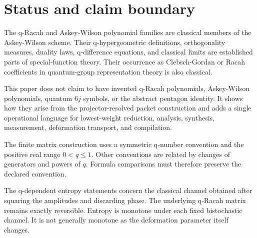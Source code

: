 \documentclass[11pt,openany]{report}
\theoremstyle{definition}
\theoremstyle{remark}
\begin{document}
\begin{abstract}
The scalar side is developed independently through the terminating q-Racah ${}_4\phi_3$ function and the continuous Askey-Wilson function. Exact duality, the $q\to1$ Racah limit, and the Askey-Wilson q-difference equation are verified symbolically or at high precision. q-Racah and Askey-Wilson functions, quantum-group recoupling, and the pentagon identity are classical. The generated contribution is the common packet architecture that retains the q-Hahn seed, projector reduction, q-Racah analysis and synthesis, stochastic measurement, deformation flow, associator certificate, and finite compiler in one system.

All figures were generated by the accompanying Python program. The release contains 32 vector figures, matching PNG files, 23 built-in checks, 20 independent tests, numerical tables, and the complete source.
\end{abstract}

\chapter*{Status and claim boundary}
The q-Racah and Askey-Wilson polynomial families are classical members of the Askey-Wilson scheme. Their q-hypergeometric definitions, orthogonality measures, duality laws, q-difference equations, and classical limits are established parts of special-function theory. Their occurrence as Clebsch-Gordan or Racah coefficients in quantum-group representation theory is also classical.

This paper does not claim to have invented q-Racah polynomials, Askey-Wilson polynomials, quantum $6j$ symbols, or the abstract pentagon identity. It shows how they arise from the projector-resolved packet construction and adds a single operational language for lowest-weight reduction, analysis, synthesis, measurement, deformation transport, and compilation.

The finite matrix construction uses a symmetric q-number convention and the positive real range $0<q\le1$. Other conventions are related by changes of generators and powers of $q$. Formula comparisons must therefore preserve the declared convention.

The q-dependent entropy statements concern the classical channel obtained after squaring the amplitudes and discarding phase. The underlying q-Racah matrix remains exactly reversible. Entropy is monotone under each fixed bistochastic channel. It is not generally monotone as the deformation parameter itself changes.
\end{document}
